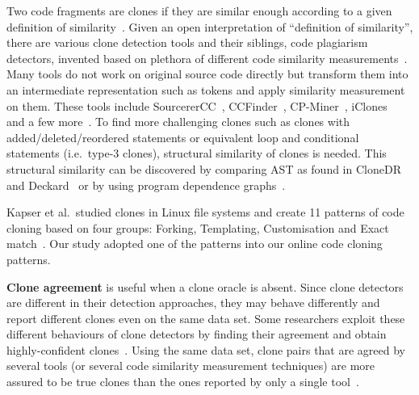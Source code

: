 \documentclass[sigconf,review, anonymous]{acmart}
\begin{document}
Two code fragments are clones if they are similar enough according to
a given definition of similarity~\cite{Bellon2007}. Given an open
interpretation of ``definition of similarity'', there are various
clone detection tools and their siblings, code plagiarism detectors,
invented based on plethora of different code similarity
measurements~\cite{Roy2008, Ragkhitwetsagul2016,Svajlenko2014}. 
Many tools do not work on original source code directly but transform them into an
intermediate representation such as tokens and apply similarity
measurement on them. These tools include SourcererCC~\cite{Sajnani2016}, CCFinder~\cite{Kamiya2002},
CP-Miner~\cite{Li2006}, iClones~\cite{Gode2009} and a few more~\cite{Burrows2007, Smith2009, Duric2012, Prechelt2002, Schleimer2003}. 
To find more challenging clones such as clones with added/deleted/reordered statements or equivalent loop and conditional statements (i.e.~type-3 clones), structural similarity of clones is needed.
This structural similarity can be discovered by comparing AST as found in CloneDR~\cite{Baxter1998} and Deckard~\cite{Jiang2007a} or by using program dependence
graphs~\cite{Krinke2001,Komondoor2001}. 

Kapser et al.~studied clones in Linux file systems and create 11 patterns of code cloning based on four groups: Forking, Templating, Customisation and Exact match~\cite{Kapser2003,Kapser2008}. Our study adopted one of the patterns into our online code cloning patterns.

\textbf{Clone agreement} is useful when a clone oracle is
absent. Since clone detectors are different in their detection
approaches, they may behave differently and report different clones
even on the same data set. Some researchers exploit these different
behaviours of clone detectors by finding their agreement and obtain
highly-confident clones~\cite{Bellon2007,Wang2013}. Using the same
data set, clone pairs that are agreed by several tools (or several
code similarity measurement techniques) are more assured to be true
clones than the ones reported by only a single
tool~\cite{Wang2013,cr2016ssbse,Funaro2010}. 
\end{document}
